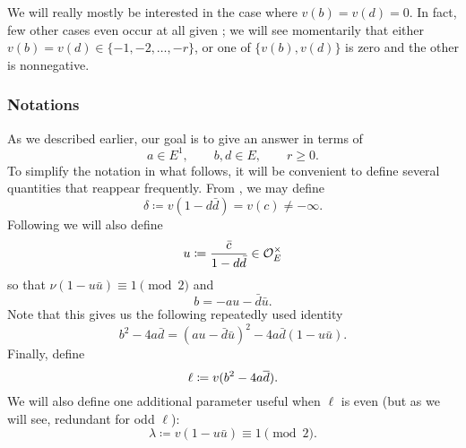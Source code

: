 We will really mostly be interested in the case where $v(b) = v(d) = 0$.
In fact, few other cases even occur at all
given ;
we will see momentarily that either
$v(b) = v(d) \in \{-1, -2, \dots, -r\}$,
or one of $\{v(b), v(d)\}$ is zero and the other is nonnegative.

\subsubsection{Notations}
As we described earlier, our goal is to give an answer in terms of
\[ a \in E^1, \qquad b, d \in E, \qquad r \ge 0. \]
To simplify the notation in what follows,
it will be convenient to define several quantities that reappear frequently.
From , we may define
\begin{equation}
  \delta \coloneqq v(1-d \bar d) = v(c) \neq -\infty.
  \label{eq:delta}
\end{equation}
Following \cite{ref:AFL} we will also define
\begin{equation}
  u \coloneqq \frac{\bar c}{1-d \bar d} \in \mathcal O_E^\times
  \label{eq:u}
\end{equation}
so that $\nu(1-u \bar u) \equiv 1 \pmod 2$ and
\begin{equation}
  b = -au - \bar{d} \bar{u}.
  \label{eq:b}
\end{equation}
Note that this gives us the following repeatedly used identity
\begin{equation}
  b^2-4a\bar d = (au-\bar d \bar u)^2 - 4a\bar d(1-u\bar u).
  \label{eq:dos}
\end{equation}
Finally, define
\begin{equation}
  \ell \coloneqq v(b^2 - 4 a \overline d).
  \label{eq:ell}
\end{equation}
We will also define one additional parameter useful when $\ell$ is even
(but as we will see, redundant for odd $\ell$):
\begin{equation}
  \lambda \coloneqq v(1-u \bar u) \equiv 1 \pmod 2.
  \label{eq:lambda}
\end{equation}

